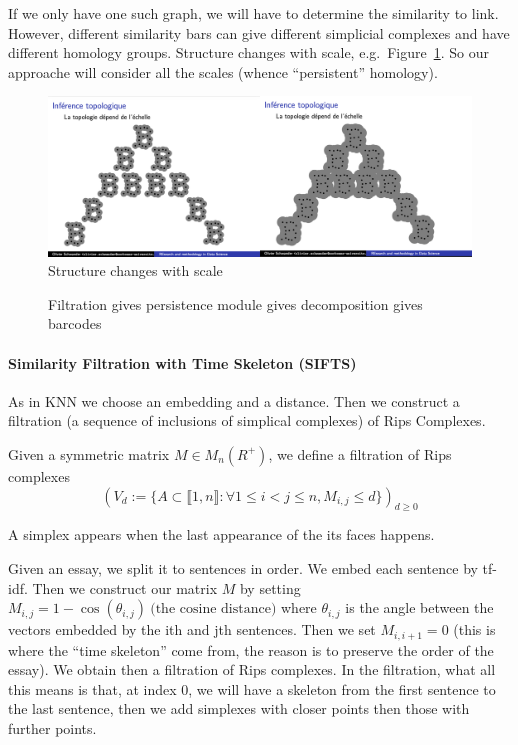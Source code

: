 If we only have one such graph, we will have to determine the similarity to link.
However, different similarity bars can give different simplicial complexes and have
different homology groups. Structure changes with scale, e.g.\ Figure~\ref{fig:scale}.
So our approache will consider all the scales (whence ``persistent'' homology).

\begin{figure}[H]
\centering
\includegraphics[width=14cm]{scale.png}
\caption{Structure changes with scale}
\label{fig:scale}
\end{figure}

\begin{figure}[H]
  \centering
  
  \caption{Filtration gives persistence module gives decomposition gives barcodes}
  \label{fig:tda_diagram}
  \end{figure}

\paragraph{Similarity Filtration with Time Skeleton (SIFTS) \cite{Zhu_2013}}

As in KNN we choose an embedding and a
distance. Then we construct a filtration (a sequence of inclusions
of simplical complexes) of Rips Complexes.

\begin{definition}
  Given a symmetric matrix $M \in M_n(R^+)$, we define a filtration of Rips complexes
  $$
  (V_d := \{A \subset \llbracket 1, n\rrbracket :
  \forall 1\le i<j\le n, M_{i, j} \le d\})_{d\ge 0}
  $$
\end{definition}
\RM A simplex appears when the last appearance of the its faces happens.

Given an essay, we split it to sentences in order. We embed each sentence by tf-idf.
Then we construct our matrix $M$ by setting $M_{i, j} = 1-\cos(\theta_{i,j})~\text{(the cosine distance)}$
where $\theta_{i, j}$ is the angle between the vectors embedded by the ith and jth sentences.
Then we set $M_{i, i+1} = 0$ (this is where the ``time skeleton'' come from, the reason is
to preserve the order of the essay). We obtain then
a filtration of Rips complexes.
In the filtration, what all this means is that,
at index 0, we will have a skeleton from the first sentence to the last sentence,
then we add simplexes with closer points then those with further points.

